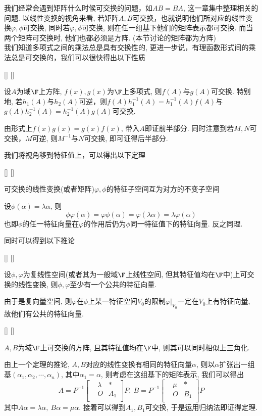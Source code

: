 \documentclass[UTF8]{ctexart}
\begin{document}
		我们经常会遇到矩阵什么时候可交换的问题，如$AB=BA$, 这一章集中整理相关的问题. 以线性变换的视角来看, 若矩阵$A,B$可交换，也就说明他们所对应的线性变换$\varphi,\phi$可交换, 同时若$\varphi,\phi$可交换, 则在任一组基下他们的矩阵表示都可交换. 而当两个矩阵可交换时, 他们也都必须是方阵. (本节讨论的矩阵都为方阵)\\
		我们知道多项式之间的乘法总是具有交换性的, 更进一步说，有理函数形式间的乘法总是可交换的，我们可以很快得出以下性质
		\begin{ppt}
			[]
			{}
			[]
			[]
			
			设$A$为域$\F$上方阵, $f(x),g(x)$为$\F$上多项式, 则$f(A)$与$g(A)$可交换. 特别地, 若$h_1(A)$与$h_2(A)$可逆，则$f(A)h^{-1}_1(A)=h^{-1}_1(A)f(A)$与$g(A)h^{-1}_2(A)=h^{-1}_2(A)g(A)$可交换.
		\end{ppt}
		\begin{prf}
			由形式上$f(x)g(x)=g(x)f(x)$, 带入$A$即证前半部分. 同时注意到若$M,N$可交换，$M$可逆, 则$M^{-1}$与$N$可交换, 即可证得后半部分.
		\end{prf}
		我们将视角移到特征值上，可以得出以下定理
		\begin{thm}
			[]
			{}
			[]
			[]
			
			可交换的线性变换(或者矩阵)$\varphi,\phi$的特征子空间互为对方的不变子空间
		\end{thm}
		\begin{prf}
			设$\phi(\alpha)=\lambda\alpha$, 则
			\[\phi\varphi(\alpha)=\varphi\phi(\alpha)=\varphi(\lambda\alpha)=\lambda\varphi(\alpha)\]
			也即$\phi$的任一特征向量在$\varphi$的作用后仍为$\phi$同一特征值下的特征向量. 反之同理.
		\end{prf}
		同时可以得到以下推论
		\begin{crl}
			[]
			{}
			[]
			[]
			
			设$\phi,\varphi$为复线性空间(或者其为一般域$\F$上线性空间, 但其特征值均在$\F$中)上可交换的线性变换, 则$\phi,\varphi$至少有一个公共的特征向量.
		\end{crl}
		\begin{prf}
			由于是复向量空间, 则$\varphi$在$\phi$上某一特征空间$V_0$的限制$\varphi|_{V_0}$一定在$V_0$上有特征向量, 故他们有公共的特征向量.
		\end{prf}
		\begin{thm}
			[]
			{}
			[]
			[]
			
			$A,B$为域$\F$上可交换的方阵, 且其特征值均在$\F$中, 则其可以同时相似上三角化.
		\end{thm}
		\begin{prf}
			由上一个定理的推论, $A,B$对应的线性变换有相同的特征向量$\alpha$, 则以$\alpha$扩张出一组基$(\alpha_1,\alpha_2,\cdots,\alpha_n)$, 其中$\alpha_1=\alpha$, 则考虑在这组基下的矩阵表示, 我们可以得出\[A=P^{-1}\begin{bmatrix}
				&\lambda  &*\\
				&O &A_1\\
			\end{bmatrix}P,\  B=P^{-1}\begin{bmatrix}
				&\mu &*\\
				&O &B_1\\
			\end{bmatrix}P\]
			其中$A\alpha=\lambda\alpha, \ B\alpha=\mu\alpha$. 接着可以得到$A_1,B_1$可交换, 于是运用归纳法即证得定理.
		\end{prf}
\end{document}
